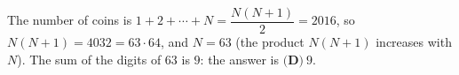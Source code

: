 The number of coins is $1+2+\cdots+N=\dfrac{N(N+1)}{2}=2016$, so $N(N+1)=4032=63\cdot64$, and $N=63$ (the product $N(N+1)$ increases with $N$). The sum of the digits of $63$ is $9$: the answer is $\boxed{\textbf{(D)}\ 9}$.

